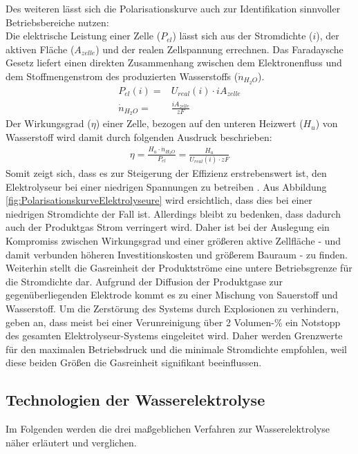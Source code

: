 Des weiteren lässt sich die Polarisationskurve auch zur Identifikation sinnvoller Betriebsbereiche nutzen:\\
Die elektrische Leistung einer Zelle ($P_{el}$) lässt sich aus der Stromdichte ($i$), der aktiven Fläche ($A_{zelle}$) und der realen Zellspannung errechnen. Das Faradaysche Gesetz liefert einen direkten Zusammenhang zwischen dem Elektronenfluss und dem Stoffmengenstrom des produzierten Wasserstoffs ($\dot{n}_{H_2O}$).
\begin{align}
	P_{el}(i) = &U_{real}(i)\cdot i A_{zelle}\\
	\dot{n}_{H_2O} = &\frac{i A_{zelle}}{zF}
	\label{gl:n_i}
\end{align}
Der Wirkungsgrad ($\eta$) einer Zelle, bezogen auf den unteren Heizwert ($H_u$) von Wasserstoff wird damit durch folgenden Ausdruck beschrieben:
\begin{align}
	\eta = \frac{H_u \cdot\dot{n}_{H_2O}}{P_{el}} = \frac{H_u}{U_{real}(i)\cdot{zF}}
\end{align}
Somit zeigt sich, dass es zur Steigerung der Effizienz erstrebenswert ist, den Elektrolyseur bei einer niedrigen Spannungen zu betreiben \citep{biaku_semiempirical_2008}. Aus Abbildung \ref{fig:PolarisationskurveElektrolyseure} wird ersichtlich, dass dies bei einer niedrigen Stromdichte der Fall ist. Allerdings bleibt zu bedenken, dass dadurch auch der Produktgas Strom verringert wird. Daher ist bei der Auslegung ein Kompromiss zwischen Wirkungsgrad und einer größeren aktive Zellfläche - und damit verbunden höheren Investitionskosten und größerem Bauraum - zu finden.\\
Weiterhin stellt die Gasreinheit der Produktströme eine untere Betriebsgrenze für die Stromdichte dar. Aufgrund der Diffusion der Produktgase zur gegenüberliegenden Elektrode kommt es zu einer Mischung von Sauerstoff und Wasserstoff. Um die Zerstörung des Systems durch Explosionen zu verhindern, geben \citet{brauns_alkaline_2020} an, dass meist bei einer Verunreinigung über 2 Volumen-\%  ein Notstopp des gesamten Elektrolyseur-Systems eingeleitet wird. Daher werden Grenzwerte für den maximalen Betriebsdruck und die minimale Stromdichte empfohlen, weil diese beiden Größen die Gasreinheit signifikant beeinflussen.\\

\subsection{Technologien der Wasserelektrolyse}
\label{subsec:Technologien der Wasserelektrolyse}
Im Folgenden werden die drei maßgeblichen Verfahren zur Wasserelektrolyse näher erläutert und verglichen.
